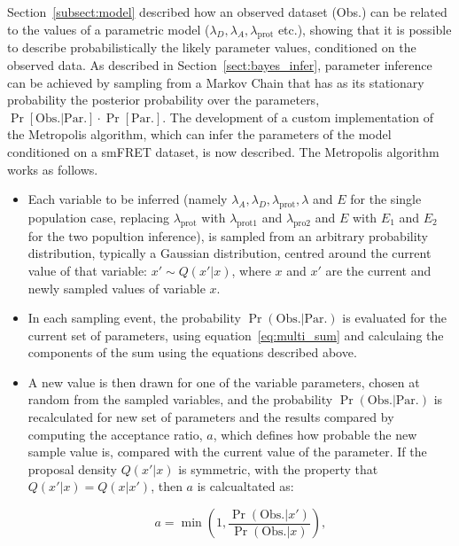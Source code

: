 Section~\ref{subsect:model} described how an observed dataset (Obs.) can be related to the values of a parametric model ($\lambda_D, \lambda_A, \lambda_{\text{prot}}$ etc.), showing that it is possible to describe probabilistically the likely parameter values, conditioned on the observed data. As described in Section~\ref{sect:bayes_infer}, parameter inference can be achieved by sampling from a Markov Chain that has as its stationary probability the posterior probability over the parameters, $\Pr[\text{Obs.} | \text{Par.}] \cdot \Pr[\text{Par.}]$. The development of a custom implementation of the Metropolis algorithm, which can infer the parameters of the model conditioned on a smFRET dataset, is now described. The Metropolis algorithm works as follows.

\begin{itemize}
\item Each variable to be inferred (namely $\lambda_A, \lambda_D, \lambda_{\text{prot}}, \lambda$ and $E$ for the single population case, replacing $\lambda_{\text{prot}}$ with $\lambda_{\text{prot1}}$ and $\lambda_{\text{pro2}}$ and $E$ with $E_1$ and $E_2$ for the two popultion inference), is sampled from an arbitrary probability distribution, typically a Gaussian distribution, centred around the current value of that variable: $x' \sim Q(x'|x) $, where $x$ and $x'$ are the current and newly sampled values of variable $x$.

\item In each sampling event, the probability $\Pr(\text{Obs.} | \text{Par.})$ is evaluated for the current set of parameters, using equation~\ref{eq:multi_sum} and calculaing the components of the sum using the equations described above.  

\item A new value is then drawn for one of the variable parameters, chosen at random from the sampled variables, and the probability $\Pr(\text{Obs.} | \text{Par.})$ is recalculated for new set of parameters and the results compared by computing the acceptance ratio, $a$, which defines how probable the new sample value is, compared with the current value of the parameter. If the proposal density $Q(x'|x)$ is symmetric, with the property that $Q(x'|x) = Q(x|x')$, then $a$ is calcualtated as:

\begin{equation}
a = \min(1, \frac{\Pr(\text{Obs.} | x')}{\Pr(\text{Obs.} | x)}),
\end {equation}


\end{itemize}
